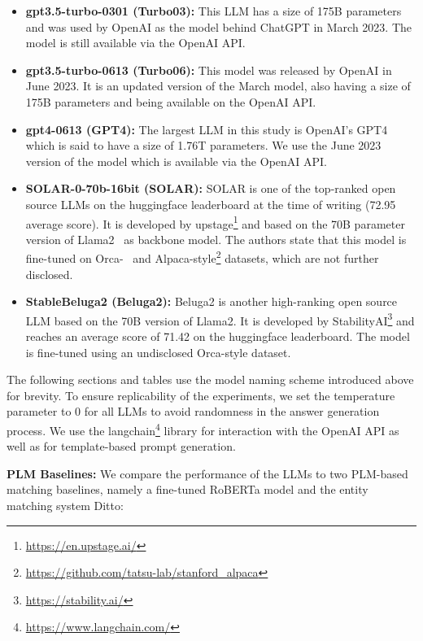 \documentclass[sigconf,nonacm]{acmart}
\begin{document}
\begin{itemize}
    \item \textbf{gpt3.5-turbo-0301 (Turbo03):} This LLM has a size of 175B parameters and was used by OpenAI as the model behind ChatGPT in March 2023. The model is still available via the OpenAI API.
    \item \textbf{gpt3.5-turbo-0613 (Turbo06):} This model was released by OpenAI in June 2023. It is an updated version of the March model, also having a size of 175B parameters and being available on the OpenAI API.
    \item \textbf{gpt4-0613 (GPT4):} The largest LLM in this study is OpenAI's GPT4 which is said to have a size of 1.76T parameters. We use the June 2023 version of the model which is available via the OpenAI API.
    \item \textbf{SOLAR-0-70b-16bit (SOLAR):} SOLAR is one of the top-ranked open source LLMs on the huggingface leaderboard at the time of writing (72.95 average score). It is developed by upstage\footnote{\url{https://en.upstage.ai/}} and based on the 70B parameter version of Llama2~\cite{touvron2023llama} as backbone model. The authors state that this model is fine-tuned on Orca-~\cite{mukherjee2023orca} and Alpaca-style\footnote{\url{https://github.com/tatsu-lab/stanford_alpaca}} datasets, which are not further disclosed.
    \item \textbf{StableBeluga2 (Beluga2):} Beluga2 is another high-ranking open source LLM based on the 70B version of Llama2. It is developed by StabilityAI\footnote{\url{https://stability.ai/}} and reaches an average score of 71.42 on the huggingface leaderboard. The model is fine-tuned using an undisclosed Orca-style dataset.
\end{itemize}


The following sections and tables use the model naming scheme introduced above for brevity. To ensure replicability of the experiments, we set the temperature parameter to 0 for all LLMs to avoid randomness in the answer generation process. We use the langchain\footnote{\url{https://www.langchain.com/}} library for interaction with the OpenAI API as well as for template-based prompt generation.

\textbf{PLM Baselines:} We compare the performance of the LLMs to two PLM-based matching baselines, namely a fine-tuned RoBERTa model and the entity matching system Ditto:
\end{document}
